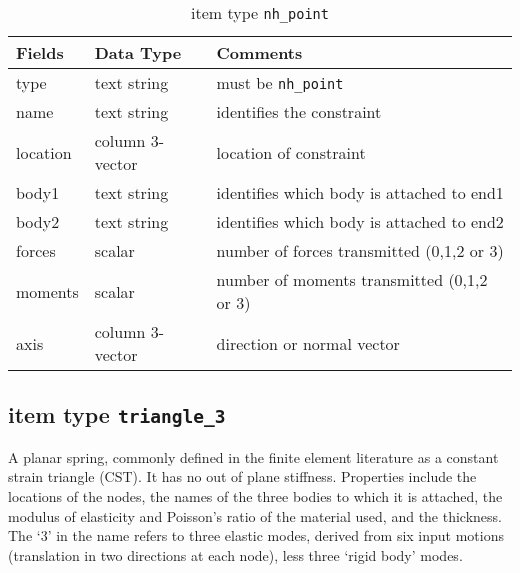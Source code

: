 \begin{table}[!h]
\caption{item type \texttt{nh\_point}}
\label{nhpoint}
\begin{center}
\begin{tabular}{lll}
\toprule
Fields & Data Type & Comments\\
\midrule
type & text string & must be \texttt{nh\_point}\\
name & text string & identifies the constraint\\
location & column 3-vector & location of constraint\\
body1 & text string & identifies which body is attached to end1\\
body2 & text string & identifies which body is attached to end2\\
forces & scalar & number of forces transmitted (0,1,2 or 3)\\
moments & scalar & number of moments transmitted (0,1,2 or 3)\\
axis & column 3-vector & direction or normal vector\\
\bottomrule
\end{tabular}
\end{center}
\end{table}
\clearpage

\subsection{item type \texttt{triangle\_3}}
A planar spring, commonly defined in the finite element literature as a constant strain triangle (CST).  It has no out of plane stiffness.  Properties include the locations of the nodes, the names of the three bodies to which it is attached, the modulus of elasticity and Poisson's ratio of the material used, and the thickness.  The `3' in the name refers to three elastic modes, derived from six input motions (translation in two directions at each node), less three `rigid body' modes. 

